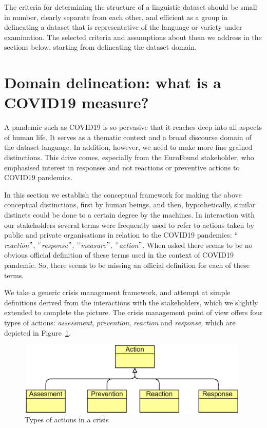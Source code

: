 The criteria for determining the structure of a linguistic dataset should be small in number, clearly separate from each other, and efficient as a group in delineating a dataset that is representative of the language or variety under examination. The selected criteria and assumptions about them we address in the sections below, starting from delineating the dataset domain. 

\section{Domain delineation: what is a COVID19 measure?}

A pandemic such as COVID19 is so pervasive that it reaches deep into all aspects of human life. It serves as a thematic context and a broad discourse domain of the dataset language. In addition, however, we need to make more fine grained distinctions. This drive comes, especially from the EuroFound stakeholder, who emphasised interest in responses and not reactions or preventive actions to COVID19 pandemics. 

In this section we establish the conceptual framework for making the above conceptual distinctions, first by human beings, and then, hypothetically, similar distincts could be done to a certain degree by the machines. 
In interaction with our stakeholders several terms were frequently used to refer to actions taken by public and private organisations in relation to the COVID19 pandemics: \textit{$``$reaction$"$}, \textit{$``$response$"$, $``$measure$"$, $``$action$"$}. When asked there seems to be no obvious official definition of these terms used in the context of COVID19 pandemic. So, there seems to be missing an official definition for each of these terms. 

We take a generic crisis management framework, and attempt at simple definitions derived from the interactions with the stakeholders, which we slightly extended to complete the picture. The crisis management point of view offers four types of actions: \textit{assessment}, \textit{prevention}, \textit{reaction} and \textit{response}, which are depicted in \mbox{Figure \ref{fig:Types_of_actions_in_a_crisis}. }

\begin{Center}
\begin{figure}[H]
	\begin{Center}
		\includegraphics[width=4.36in,height=1.37in]{images/image6.png}
		\caption{Types of actions in a crisis}
		\label{fig:Types_of_actions_in_a_crisis}
	\end{Center}
\end{figure}
\end{Center}

